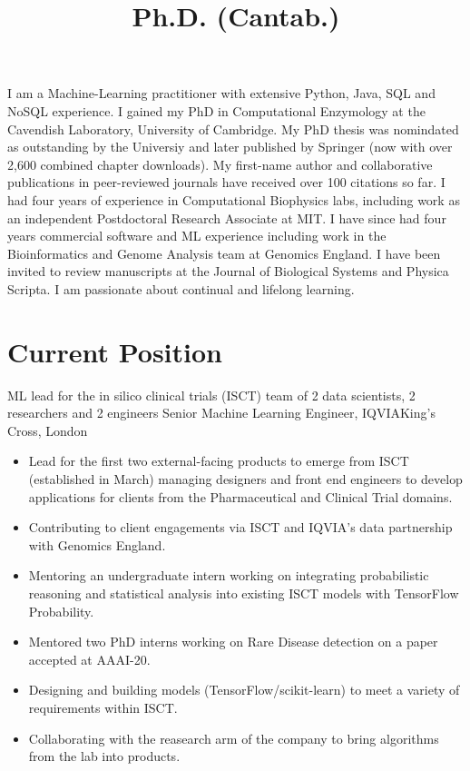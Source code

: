 \documentclass[11pt,a4paper,sans]{moderncv}        %
\title{Ph.D. (Cantab.)}                               %
\begin{document}
\makecvtitle
\vspace*{-1.0cm}
%
I am a Machine-Learning practitioner with extensive Python, Java, SQL and NoSQL experience. 
%
I gained my PhD in Computational Enzymology at the Cavendish Laboratory, University of Cambridge. 
%
My PhD thesis was nomindated as outstanding by the Universiy and later published by Springer (now with over 2,600 combined chapter downloads).
%
My first-name author and collaborative publications in peer-reviewed journals have received over 100 citations so far. 
%
I had four years of experience in Computational Biophysics labs, including work as an independent Postdoctoral Research Associate at MIT. 
%
I have since had four years commercial software and ML experience including work in the Bioinformatics and Genome Analysis team at Genomics England. 
%
I have been invited to review manuscripts at the Journal of Biological Systems and Physica Scripta. 
%
I am passionate about continual and lifelong learning.


\vspace*{-0.4cm}
\section{Current Position}
\vspace*{-0.15cm}
{\small{ML lead for the in silico clinical trials (ISCT) team of 2 data scientists, 2 researchers and 2 engineers}}
{Senior Machine Learning Engineer, IQVIA}{King's Cross, London}{}
{
\begin{itemize}%
\item Lead for the first two external-facing products to emerge from ISCT (established in March)
managing designers and front end engineers to develop applications for clients
from the Pharmaceutical and Clinical Trial domains.
\item Contributing to client engagements via ISCT and IQVIA's data partnership with Genomics England.
\item Mentoring an undergraduate intern working on integrating 
probabilistic reasoning and statistical analysis into 
existing ISCT models with TensorFlow Probability.
\item Mentored two PhD interns working on Rare Disease detection on a paper accepted at AAAI-20.
\item Designing and building models (TensorFlow/scikit-learn)
to meet a variety of requirements within ISCT.
\item Collaborating with the reasearch arm of the company to bring 
algorithms from the lab into products.
\end{itemize}}
\vspace*{-0.4cm}
\end{document}
